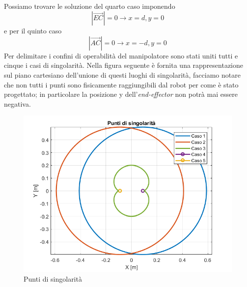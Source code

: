 \\Possiamo trovare le soluzione del quarto caso imponendo \begin{equation}|\overrightarrow{EC}| = 0 \rightarrow x=d, y = 0
\end{equation}
e per il quinto caso 
\begin{equation}
	|\overrightarrow{AC}| = 0 \rightarrow x=-d, y=0
\end{equation}
Per delimitare i confini di operabilità del manipolatore sono stati uniti tutti e cinque i casi di singolarità. Nella figura seguente è fornita una rappresentazione sul piano cartesiano dell'unione di questi luoghi di singolarità, facciamo notare che non tutti i punti sono fisicamente raggiungibili dal robot per come è stato progettato; in particolare la posizione y dell'\textit{end-effector} non potrà mai essere negativa.
\begin{figure}[ht]
\begin{center}
    \includegraphics[scale=0.65]{Immagini/Singolarity/SingNewNew}
    \caption{Punti di singolarità}
    \label{puntiSing}
\end{center}
\end{figure}
